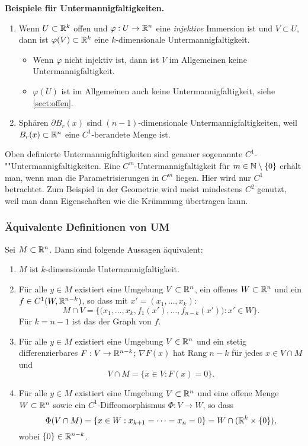 \textbf{Beispiele für Untermannigfaltigkeiten.}
\begin{enumerate}
 \item Wenn $U \subset \mathbb{R}^k$ offen und $\varphi: U \to \mathbb{R}^n$ eine \emph{injektive} Immersion ist und $V \subset U$, dann ist $\varphi(V) \subset \mathbb{R}^k$ eine $k$-dimensionale Untermannigfaltigkeit.
 \begin{itemize}
  \item Wenn $\varphi$ nicht injektiv ist, dann ist $V$ im Allgemeinen keine Untermannigfaltigkeit.
  \item $\varphi(U)$ ist im Allgemeinen auch keine Untermannigfaltigkeit, siehe \ref{sect:offen}.
 \end{itemize}
 \item Sphären $\partial B_r(x)$ sind $(n-1)$-dimensionale Untermannigfaltigkeiten, weil $B_r(x) \subset \mathbb{R}^n$ eine $C^1$-berandete Menge ist.
\end{enumerate}

\begin{rmrk}
 Oben definierte Untermannigfaltigkeiten sind genauer sogenannte $C^1$-""Untermannigfaltigkeiten. Eine $C^m$-Untermannigfaltigkeit für $m \in \mathbb{N} \setminus \{0\}$ erhält man, wenn man die Parametrisierungen in $C^m$ liegen. Hier wird nur $C^1$ betrachtet. Zum Beispiel in der Geometrie wird meist mindestens $C^2$ genutzt, weil man dann Eigenschaften wie die Krümmung übertragen kann.
\end{rmrk}

\newpage

\subsubsection{Äquivalente Definitionen von UM}
\begin{thm}
 Sei $M \subset \mathbb{R}^n$. Dann sind folgende Aussagen äquivalent:
 \begin{enumerate}
  \item $M$ ist $k$-dimensionale Untermannigfaltigkeit.
  \item Für alle $y \in M$ existiert eine Umgebung $V \subset \mathbb{R}^n$, ein offenes $W \subset \mathbb{R}^n$ und ein $f \in C^1(W, \mathbb{R}^{n-k})$, so dass mit $x' = (x_1, \ldots, x_k)$:
  \[ M \cap V = \{ \big(x_1, \ldots, x_k, f_1(x'), \ldots, f_{n-k}(x') \big) : x' \in W \}. \]
  Für $k = n-1$ ist das der Graph von $f$.
  \item Für alle $y \in M$ existiert eine Umgebung $V \in \mathbb{R}^n$ und ein stetig differenzierbares $F:V \to \mathbb{R}^{n-k}$; $\nabla F(x)$ hat Rang $n-k$ für jedes $x \in V \cap M$ und
  \[ V \cap M = \{ x \in V : F(x) = 0 \}. \]
  \item Für alle $y \in M$ existiert eine Umgebung $V \subset \mathbb{R}^n$ und eine offene Menge $W \subset \mathbb{R}^n$ sowie ein $C^1$-Diffeomorphismus $\Phi: V \to W$, so dass
  \[ \Phi(V \cap M) = \{ x \in W : x_{k+1} = \cdots = x_n = 0 \} = W \cap (\mathbb{R}^k \times \{ 0 \}), \]
  wobei $\{ 0 \} \in \mathbb{R}^{n-k}$.
 \end{enumerate}
\end{thm}

